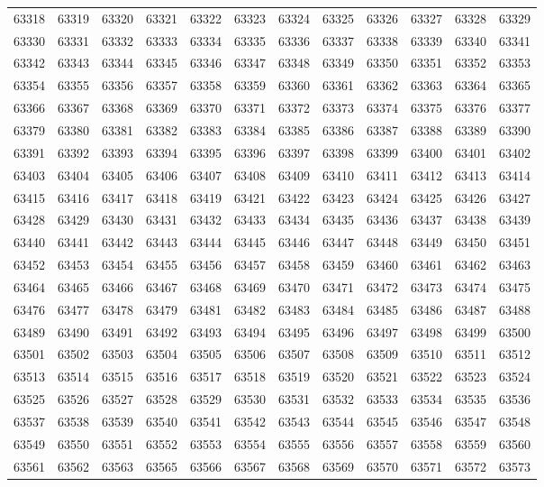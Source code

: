\begin{center}
\begin{longtable}{llllllllllll}
63318 &63319 &63320 &63321 &63322 &63323 &63324 &63325 &63326 &63327 &63328 &63329 \\
63330 &63331 &63332 &63333 &63334 &63335 &63336 &63337 &63338 &63339 &63340 &63341 \\
63342 &63343 &63344 &63345 &63346 &63347 &63348 &63349 &63350 &63351 &63352 &63353 \\
63354 &63355 &63356 &63357 &63358 &63359 &63360 &63361 &63362 &63363 &63364 &63365 \\
63366 &63367 &63368 &63369 &63370 &63371 &63372 &63373 &63374 &63375 &63376 &63377 \\
63379 &63380 &63381 &63382 &63383 &63384 &63385 &63386 &63387 &63388 &63389 &63390 \\
63391 &63392 &63393 &63394 &63395 &63396 &63397 &63398 &63399 &63400 &63401 &63402 \\
63403 &63404 &63405 &63406 &63407 &63408 &63409 &63410 &63411 &63412 &63413 &63414 \\
63415 &63416 &63417 &63418 &63419 &63421 &63422 &63423 &63424 &63425 &63426 &63427 \\
63428 &63429 &63430 &63431 &63432 &63433 &63434 &63435 &63436 &63437 &63438 &63439 \\
63440 &63441 &63442 &63443 &63444 &63445 &63446 &63447 &63448 &63449 &63450 &63451 \\
63452 &63453 &63454 &63455 &63456 &63457 &63458 &63459 &63460 &63461 &63462 &63463 \\
63464 &63465 &63466 &63467 &63468 &63469 &63470 &63471 &63472 &63473 &63474 &63475 \\
63476 &63477 &63478 &63479 &63481 &63482 &63483 &63484 &63485 &63486 &63487 &63488 \\
63489 &63490 &63491 &63492 &63493 &63494 &63495 &63496 &63497 &63498 &63499 &63500 \\
63501 &63502 &63503 &63504 &63505 &63506 &63507 &63508 &63509 &63510 &63511 &63512 \\
63513 &63514 &63515 &63516 &63517 &63518 &63519 &63520 &63521 &63522 &63523 &63524 \\
63525 &63526 &63527 &63528 &63529 &63530 &63531 &63532 &63533 &63534 &63535 &63536 \\
63537 &63538 &63539 &63540 &63541 &63542 &63543 &63544 &63545 &63546 &63547 &63548 \\
63549 &63550 &63551 &63552 &63553 &63554 &63555 &63556 &63557 &63558 &63559 &63560 \\
63561 &63562 &63563 &63565 &63566 &63567 &63568 &63569 &63570 &63571 &63572 &63573 \\

\end{longtable}
\end{center}
